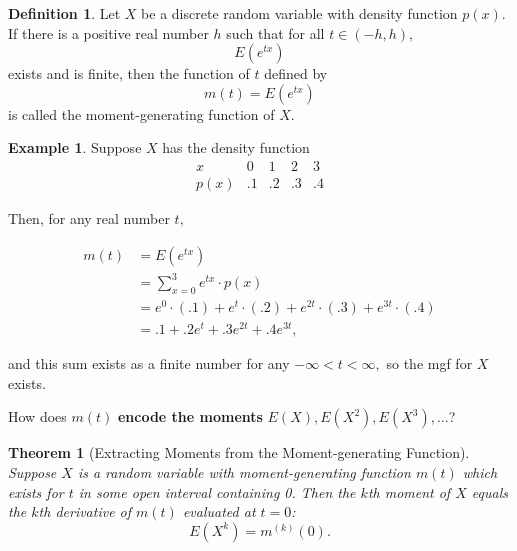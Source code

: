 \documentclass[
]{book}
\newtheorem{theorem}{Theorem}[chapter]
\theoremstyle{definition}
\newtheorem{definition}{Definition}[chapter]
\theoremstyle{definition}
\newtheorem{example}{Example}[chapter]
\theoremstyle{definition}
\theoremstyle{definition}
\theoremstyle{remark}
\begin{document}
\begin{definition}
\protect\hypertarget{def:moment-generating-function}{}\label{def:moment-generating-function}Let \(X\) be a discrete random variable with density function \(p(x)\). If there is a positive real number \(h\) such that for all \(t \in (-h,h),\) \[E(e^{tx})\] exists and is finite, then the function of \(t\) defined by \[m(t) = E(e^{tx})\] is called the moment-generating function of \(X\).
\end{definition}

\begin{example}
Suppose \(X\) has the density function
\[
\begin{array}{c|c|c|c|c}
x & 0 & 1 & 2 & 3  \\ \hline
p(x) & .1 & .2 & .3 & .4
\end{array}
\]

Then, for any real number \(t,\)

\begin{align*}
m(t) &= E(e^{tx}) \\
  &= \sum_{x=0}^3 e^{tx}\cdot p(x)\\
  &= e^0\cdot (.1) +e^t\cdot (.2)+e^{2t}\cdot (.3) +e^{3t}\cdot (.4)\\
  &= .1 + .2e^t + .3e^{2t} + .4e^{3t},
\end{align*}

and this sum exists as a finite number for any \(-\infty < t < \infty,\) so the mgf for \(X\) exists.
\end{example}

How does \(m(t)\) \textbf{encode the moments} \(E(X), E(X^2), E(X^3), \ldots\)?

\begin{theorem}[Extracting Moments from the Moment-generating Function]
\protect\hypertarget{thm:mgf}{}\label{thm:mgf}Suppose \(X\) is a random variable with moment-generating function \(m(t)\) which exists for \(t\) in some open interval containing 0. Then the \(k\)th moment of \(X\) equals the \(k\)th derivative of \(m(t)\) evaluated at \(t = 0\):
\[E(X^k) = m^{(k)}(0).\]
\end{theorem}
\end{document}
